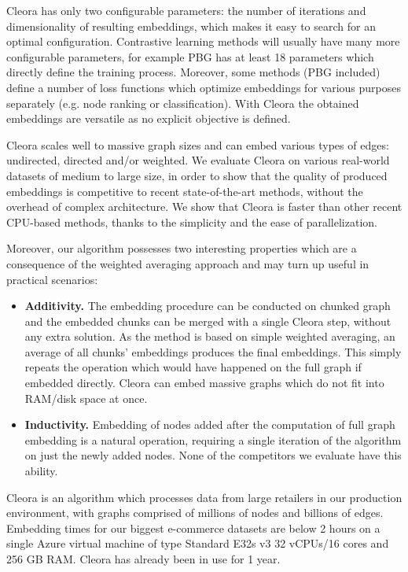 \documentclass{IEEEtran}
\begin{document}
Cleora has only two configurable parameters: the number of iterations and dimensionality of resulting embeddings, which makes it easy to search for an optimal configuration. Contrastive learning methods will usually have many more configurable parameters, for example PBG has at least 18 parameters which directly define the training process. Moreover, some methods (PBG included) define a number of loss functions which optimize embeddings for various purposes separately (e.g. node ranking or classification). With Cleora the obtained embeddings are versatile as no explicit objective is defined.


Cleora scales well to massive graph sizes and can embed various types of edges: undirected, directed and/or weighted. We evaluate Cleora on various real-world datasets of medium to large size, in order to show that the quality of  produced  embeddings is competitive to recent state-of-the-art methods, without the overhead of complex architecture. We show that Cleora is faster than other recent CPU-based methods, thanks to the simplicity and the ease of parallelization.

Moreover, our algorithm possesses two interesting properties which are a consequence of the weighted averaging approach and may turn up useful in practical scenarios:
\begin{itemize}
    \item \textbf{Additivity.} The embedding procedure can be conducted on chunked graph and the embedded chunks can be merged with a single Cleora step, without any extra solution. As the method is based on simple weighted averaging, an average of all chunks' embeddings produces the final embeddings. This simply repeats the operation which would have happened on the full graph if embedded directly. Cleora can embed massive graphs which do not fit into RAM/disk space at once.
    
    \item \textbf{Inductivity.} Embedding of nodes added after the computation of full graph embedding is a natural operation, requiring a single iteration of the algorithm on just the newly added nodes. None of the competitors we evaluate have this ability.
    


\end{itemize}

Cleora is an algorithm which processes data from large retailers in our production environment, with graphs comprised of millions of nodes and billions of edges. Embedding times for our biggest e-commerce datasets are below 2 hours on a single Azure virtual machine of type Standard E32s v3 32 vCPUs/16 cores and 256 GB RAM. Cleora has already been in use for 1 year.
\end{document}
